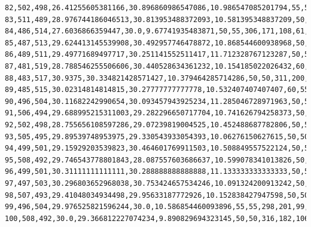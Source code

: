 \documentclass[authoryearcitations]{UoYCSproject}
\begin{document}
\begin{landscape}
\begin{verbatim}
82,502,498,26.41255605381166,30.896860986547086,10.986547085201794,55,50,297,201,100,75,54,57,49,42,33,19,22,20,15,8,6,0,2,0,0
83,511,489,28.976744186046513,30.813953488372093,10.581395348837209,50,50,298,190,98,71,69,52,43,48,41,26,17,17,12,11,4,2,0,1,0
84,486,514,27.6036866359447,30.0,9.67741935483871,50,55,306,171,108,61,68,62,50,41,43,32,16,16,9,10,4,2,1,0,0
85,487,513,29.624413145539908,30.492957746478872,10.868544600938968,50,55,301,176,98,74,57,61,53,45,37,33,28,10,11,6,6,3,1,0,0
86,489,511,29.49771689497717,30.251141552511417,11.712328767123287,50,55,312,166,91,71,61,57,57,42,40,33,21,25,5,8,4,5,2,0,0
87,481,519,28.788546255506606,30.440528634361232,10.154185022026432,60,50,322,169,90,63,57,60,53,41,43,26,27,18,15,4,4,5,3,0,0
88,483,517,30.9375,30.334821428571427,10.379464285714286,50,50,311,200,84,57,51,61,48,46,35,41,22,14,16,7,3,3,0,1,0
89,485,515,30.02314814814815,30.27777777777778,10.532407407407407,60,55,301,193,111,61,46,52,45,42,38,36,23,25,10,12,1,2,1,1,0
90,496,504,30.11682242990654,30.093457943925234,11.285046728971963,50,50,297,195,92,77,54,46,50,35,35,40,27,20,13,13,4,1,1,0,0
91,506,494,29.688995215311003,29.282296650717704,10.741626794258373,50,50,290,191,98,66,71,49,40,46,29,26,33,30,13,9,8,0,1,0,0
92,502,498,28.755656108597286,29.07239819004525,10.452488687782806,50,55,304,182,93,66,59,67,47,35,36,25,21,30,18,9,8,0,0,0,0
93,505,495,29.89539748953975,29.330543933054393,10.06276150627615,50,50,337,159,94,70,53,54,53,43,28,29,19,16,22,13,9,1,0,0,0
94,499,501,29.15929203539823,30.464601769911503,10.508849557522124,50,55,331,172,88,60,68,45,53,42,35,33,15,17,17,14,4,6,0,0,0
95,508,492,29.746543778801843,28.087557603686637,10.599078341013826,50,55,311,191,89,65,56,64,37,47,36,30,22,10,16,12,9,4,1,0,0
96,499,501,30.31111111111111,30.288888888888888,11.133333333333333,50,50,306,207,95,53,56,56,50,39,40,34,21,10,11,9,8,4,1,0,0
97,497,503,30.296803652968038,30.753424657534246,10.091324200913242,50,50,303,203,94,59,53,51,57,40,37,31,28,15,7,8,7,6,1,0,0
98,507,493,29.41048034934498,29.95633187772926,10.152838427947598,50,50,319,181,107,56,54,51,53,44,25,34,30,19,12,6,4,4,1,0,0
99,496,504,29.976525821596244,30.0,10.586854460093896,55,55,298,201,99,69,49,47,51,48,34,23,25,26,16,8,2,3,1,0,0
100,508,492,30.0,29.366812227074234,9.890829694323145,50,50,316,182,106,63,61,45,45,47,34,26,16,17,25,10,4,2,1,0,0
\end{verbatim}
\end{landscape}
\end{document}

